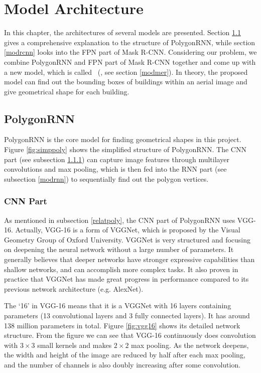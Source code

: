\chapter{Model Architecture}

In this chapter, the architectures of several models are presented. Section \ref{modpoly} gives a comprehensive explanation to the structure of PolygonRNN, while section \ref{modrcnn} looks into the FPN part of Mask R-CNN. Considering our problem, we combine PolygonRNN and FPN part of Mask R-CNN together and come up with a new model, which is called \modelnameshort\ (\modelnamelong, see section \ref{modmer}). In theory, the proposed model can find out the bounding boxes of buildings within an aerial image and give geometrical shape for each building.
 
\section{PolygonRNN}\label{modpoly}

PolygonRNN is the core model for finding geometrical shapes in this project. Figure \ref{fig:simppoly} shows the simplified structure of PolygonRNN. The CNN part (see subsection \ref{modcnn}) can capture image features through multilayer convolutions and max pooling, which is then fed into the RNN part (see subsection \ref{modrnn}) to sequentially find out the polygon vertices.



\subsection{CNN Part}\label{modcnn}

As mentioned in subsection \ref{relatpoly}, the CNN part of PolygonRNN uses VGG-16. Actually, VGG-16 is a form of VGGNet, which is proposed by the Visual Geometry Group of Oxford University. VGGNet is very structured and focusing on deepening the  neural network without a large number of parameters. It generally believes that deeper networks have stronger expressive capabilities than shallow networks, and can accomplish more complex tasks. It also proven in practice that VGGNet has made great progress in performance compared to its previous network architecture (e.g. AlexNet).

The `16' in VGG-16 means that it is a VGGNet with 16 layers containing parameters (13 convolutional layers and 3 fully connected layers). It has around 138 million parameters in total. Figure \ref{fig:vgg16} shows its detailed network structure. From the figure we can see that VGG-16 continuously does convolution with $3\times3$ small kernels and makes $2\times2$ max pooling. As the network deepens, the width and height of the image are reduced by half after each max pooling, and the number of channels is also doubly increasing after some convolution.

